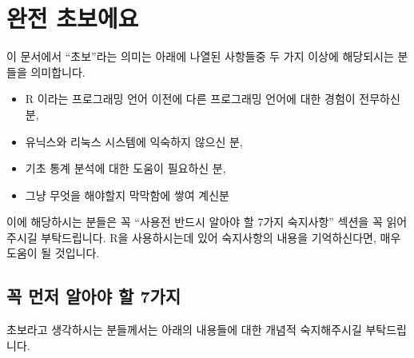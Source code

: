 \documentclass{report}
\begin{document}
%
%
%

\chapter{완전 초보에요}

이 문서에서 ``초보''라는 의미는 아래에 나열된 사항들중 두 가지 이상에 해당되시는 분들을 의미합니다. 

\begin{itemize}
\item R 이라는 프로그래밍 언어 이전에 다른 프로그래밍 언어에 대한 경험이 전무하신 분,
\item 유닉스와 리눅스 시스템에 익숙하지 않으신 분,
\item 기초 통계 분석에 대한 도움이 필요하신 분,
\item 그냥 무엇을 해야할지 막막함에 쌓여 계신분 
\end{itemize}

이에 해당하시는 분들은 꼭 ``사용전 반드시 알아야 할 7가지 숙지사항'' 섹션을 꼭 읽어주시길 부탁드립니다.
R을 사용하시는데 있어 숙지사항의 내용을 기억하신다면, 매우 도움이 될 것입니다. 

\section{꼭 먼저 알아야 할 7가지}

초보라고 생각하시는 분들께서는 아래의 내용들에 대한 개념적 숙지해주시길 부탁드립니다.
\end{document}
